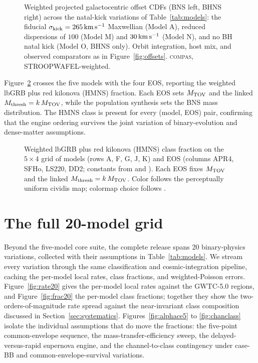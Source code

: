 \documentclass[twocolumn,amsmath]{aastex702}
\newcommand{\Mtov}{M_{\rm TOV}}
\newcommand{\Mthresh}{M_{\rm thresh}}
\newcommand{\compas}{\textsc{compas}}
\begin{document}
\begin{figure}[tbp]
\caption{Weighted projected galactocentric offset CDFs (BNS left, BHNS right)
across the natal-kick variations of Table~\ref{tab:models}: the fiducial
\citet{hobbs2005} $\sigma_{\rm kick} = 265\,{\rm km\,s^{-1}}$ Maxwellian
(Model A), reduced dispersions of $100$ (Model M) and $30\,{\rm km\,s^{-1}}$
(Model N), and no BH natal kick (Model O, BHNS only). Orbit integration, host
mix, and observed comparators as in Figure~\ref{fig:offsets}. \compas,
STROOPWAFEL-weighted. \label{fig:offsetkicks}}
\end{figure}

Figure~\ref{fig:eosmatrix} crosses the five models with the four EOS, reporting
the weighted lbGRB plus red kilonova (HMNS) fraction. Each EOS sets $\Mtov$ and
the linked $\Mthresh = k\,\Mtov$, while the population synthesis sets the BNS
mass distribution. The HMNS class is present for every (model, EOS) pair,
confirming that the engine ordering survives the joint variation of
binary-evolution and dense-matter assumptions.

\begin{figure}[tbp]
\caption{Weighted lbGRB plus red kilonova (HMNS) class fraction on the
$5 \times 4$ grid of \citet{broekgaarden2021} models (rows A, F, G, J, K) and
EOS (columns APR4, SFHo, LS220, DD2; constants from \citealt{bauswein2013,
bauswein2020} and \citealt{read2009}). Each EOS fixes $\Mtov$ and the linked
$\Mthresh = k\,\Mtov$. Color follows the perceptually uniform cividis map;
colormap choice follows \citet{crameri2020}. \label{fig:eosmatrix}}
\end{figure}

\FloatBarrier
\section{The full 20-model grid} \label{app:grid}

Beyond the five-model core suite, the complete
\citet{broekgaarden2021,broekgaarden2022} release spans 20 binary-physics
variations, collected with their assumptions in Table~\ref{tab:models}. We
stream every variation through the same classification and cosmic-integration
pipeline, caching the per-model local rates, class fractions, and
weighted-Poisson errors. Figure~\ref{fig:rate20}
gives the per-model local rates against the GWTC-5.0 regions, and
Figure~\ref{fig:frac20} the per-model class fractions; together they show the
two-orders-of-magnitude rate spread against the near-invariant class composition
discussed in Section~\ref{sec:systematics}. Figures~\ref{fig:alphace5} to
\ref{fig:chanclass} isolate the individual assumptions that do move the fractions: the
five-point common-envelope sequence, the mass-transfer-efficiency sweep, the
delayed-versus-rapid supernova engine, and the channel-to-class contingency under
case-BB and common-envelope-survival variations.
\end{document}
